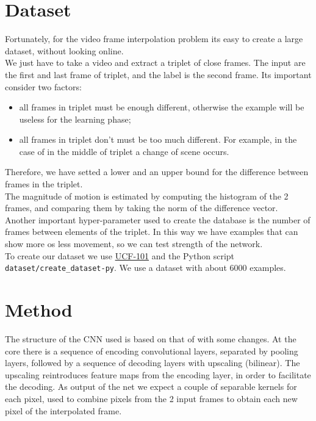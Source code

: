 \documentclass[11pt, a4paper]{article}
\begin{document}
	\section{Dataset}
	Fortunately, for the video frame interpolation problem its easy to create a large dataset, without looking online.\\
	We just have to take a video and extract a triplet of close frames. The input are the first and last frame of triplet, and the label is the second frame. Its important consider two factors:
	\begin{itemize}
		\item all frames in triplet must be enough different, otherwise the example will be useless for the learning phase;
		\item all frames in triplet don't must be too much different. For example, in the case of in the middle of triplet a change of scene occurs. 
	\end{itemize}
	Therefore, we have setted a lower and an upper bound for the difference between frames in the triplet.\\
	The magnitude of motion is estimated by computing the histogram of the 2 frames, and comparing them by taking the norm of the difference vector. \\
	Another important hyper-parameter used to create the database is the number of frames between elements of the triplet. In this way we have examples that can show more os less movement, so we can test strength of the network.\\
	To create our dataset we use \href{https://www.crcv.ucf.edu/data/UCF101.php}{UCF-101} and the Python script\\ \texttt{dataset/create\_dataset-py}. We use a dataset with about 6000 examples.
	\section{Method} %
	The structure of the CNN used is based on that of \cite{mainpaper} with some changes. At the core there is a sequence of encoding convolutional layers, separated by pooling layers, followed by a sequence of decoding layers with upscaling (bilinear). The upscaling reintroduces feature maps from the encoding layer, in order to facilitate the decoding. As output of the net we expect a couple of separable kernels for each pixel, used to combine pixels from the 2 input frames to obtain each new pixel of the interpolated frame. \\
\end{document}
